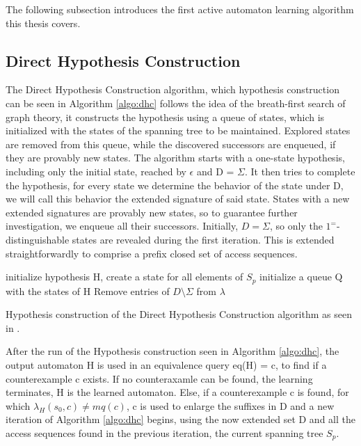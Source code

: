 The following subsection introduces the first active automaton learning algorithm this thesis covers.

\subsection{Direct Hypothesis Construction}
The Direct Hypothesis Construction algorithm, which hypothesis construction can be seen in Algorithm \ref{algo:dhc}  follows the idea of the breath-first search of graph theory, it constructs the hypothesis using a queue of states, which is initialized with the states of the spanning tree to be maintained. Explored states are removed from this queue, while the discovered successors are enqueued, if they are provably new states. The algorithm starts with a one-state hypothesis, including only the initial state, reached by $\epsilon$ and D = $\Sigma$. It then tries to complete the hypothesis, for every state we determine the behavior of the state under D, we will call this behavior the extended signature of said state. States with a new extended signatures are provably new states, so to guarantee further investigation, we enqueue all their successors. Initially, $D=\Sigma$, so only the $1^=$-distinguishable states are revealed during the first iteration. This is extended straightforwardly to comprise a prefix closed set of access sequences. \cite{Steffen2011}\cite{10.1007/978-3-642-34781-8_19}

\begin{algorithm}[H]
	\SetAlgoLined
	\DontPrintSemicolon
	initialize hypothesis H, create a state for all elements of $S_p$\;
	initialize a queue Q with the states of H\;
	Remove entries of $D\setminus\Sigma$ from $\lambda$\;
	\;
	\caption{Hypothesis construction of the Direct Hypothesis Construction algorithm as seen in \cite{Steffen2011}.}
	\label{algo:dhc}
\end{algorithm}

After the run of the Hypothesis construction seen in Algorithm \ref{algo:dhc}, the output automaton H is used in an equivalence query eq(H) = c, to find if a counterexample c exists. If no counteraxamle can be found, the learning terminates, H is the learned automaton. Else, if a counterexample c is found, for which $\lambda_H(s_0,c) \neq mq(c)$, c is used to enlarge the suffixes in D and a new iteration of Algorithm \ref{algo:dhc} begins, using the now extended set D and all the access sequences found in the previous iteration, the current spanning tree $S_p$.

